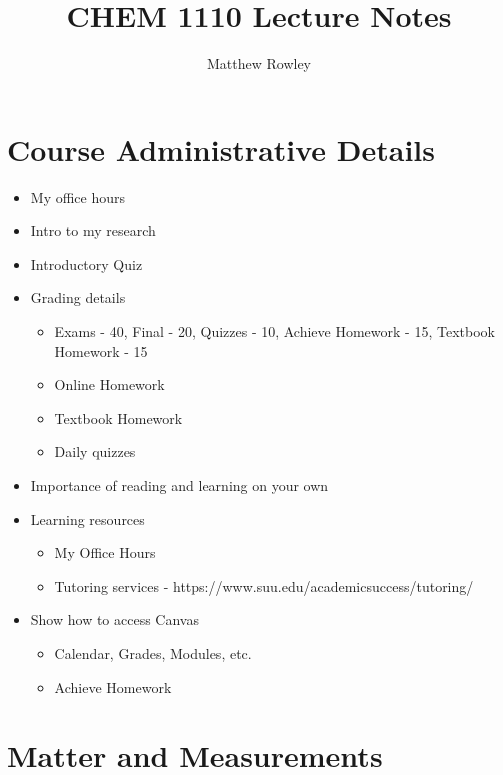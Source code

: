 \documentclass[12pt, openany, letterpaper]{memoir}
\begin{document}
\title{CHEM 1110 Lecture Notes}
\author{Matthew Rowley}
\mainmatter
\maketitle

\chapter*{Course Administrative Details}
\begin{itemize}
	\item My office hours
	\item Intro to my research
	\item Introductory Quiz
	\item Grading details
	\begin{itemize}
		\item Exams - 40, Final - 20, Quizzes - 10, Achieve Homework - 15, Textbook Homework - 15
		\item Online Homework
		\item Textbook Homework
		\item Daily quizzes
	\end{itemize}
	\item Importance of reading and learning on your own
	\item Learning resources
	\begin{itemize}
		\item My Office Hours
		\item Tutoring services - https://www.suu.edu/academicsuccess/tutoring/
	\end{itemize}
	\item Show how to access Canvas
	\begin{itemize}
		\item Calendar, Grades, Modules, etc.
		\item Achieve Homework
	\end{itemize}	
\end{itemize}

\chapter{Matter and Measurements}
\end{document}
